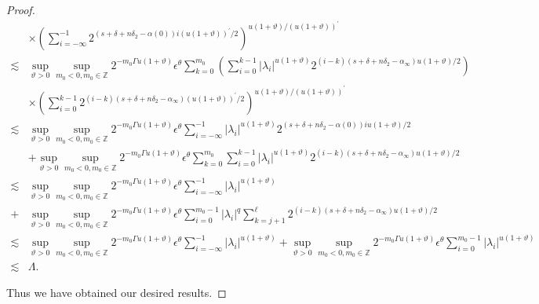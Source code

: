 \documentclass[oneside,reqno]{amsart}
\numberwithin{equation}{section}
\theoremstyle{definition}
\begin{document}
\begin{proof}
\begin{align*}
 &\times\left(\sum_{i=-\infty}^{-1} 2^{\left(s+\delta+n \delta_{2}-\alpha(0)\right) i( u(1+\vartheta))^{\prime} / 2}\right)^{u(1+\vartheta) / (u(1+\vartheta))^{\prime}} \\
\lesssim & \sup_{\vartheta>0 }\sup _{m_0<0, m_0\in  \mathbb{Z}} 2^{-m_0\Gamma u(1+\vartheta)} \epsilon  ^\theta \sum_{k=0}^{m_0}\left(\sum_{i=0}^{k-1}\left|\lambda_{i}\right|^{u(1+\vartheta)} 2^{(i-k)\left(s+\delta+n \delta_{2}-\alpha_{\infty}\right) u(1+\vartheta) / 2}\right) \\
& \times\left(\sum_{i=0}^{k-1} 2^{(i-k)\left(s+\delta+n \delta_{2}-\alpha_{\infty}\right) (u(1+\vartheta))^{\prime} / 2}\right)^{u(1+\vartheta) / (u(1+\vartheta))^{\prime}}\\
\lesssim & \sup_{\vartheta>0 }\sup _{m_0<0, m_0\in  \mathbb{Z}} 2^{-m_0\Gamma u(1+\vartheta)} \epsilon  ^\theta \sum_{i=-\infty}^{-1}\left|\lambda_{i}\right|^{u(1+\vartheta)} 2^{\left(s+\delta+n \delta_{2}-\alpha(0)\right) iu (1+\vartheta) / 2} \\
& +\sup_{\vartheta>0 }\sup _{m_0<0, m_0\in  \mathbb{Z}} 2^{-m_0\Gamma u(1+\vartheta)} \epsilon  ^\theta \sum_{k=0}^{m_0} \sum_{i=0}^{k-1}\left|\lambda_{i}\right|^{u(1+\vartheta)} 2^{(i-k)\left(s+\delta+n \delta_{2}-\alpha_{\infty}\right) u(1+\vartheta) / 2} \\
\lesssim & \sup_{\vartheta>0 }\sup _{m_0<0, m_0\in  \mathbb{Z}} 2^{-m_0\Gamma u(1+\vartheta)} \epsilon  ^\theta \sum_{i=-\infty}^{-1}\left|\lambda_{i}\right|^{u(1+\vartheta)} \\
+& \sup_{\vartheta>0 }\sup _{m_0<0, m_0\in  \mathbb{Z}} 2^{-m_0\Gamma u(1+\vartheta)} \epsilon  ^\theta \sum_{i=0}^{m_0-1}\left|\lambda_{i}\right|^{q} \sum_{k=j+1}^{\ell } 2^{(i-k)\left(s+\delta+n \delta_{2}-\alpha_{\infty}\right) u(1+\vartheta) / 2} \\
\lesssim & \sup_{\vartheta>0 }\sup _{m_0<0, m_0\in  \mathbb{Z}} 2^{-m_0\Gamma u(1+\vartheta)} \epsilon  ^\theta \sum_{i=-\infty}^{-1}\left|\lambda_{i}\right|^{u(1+\vartheta)}+\sup_{\vartheta>0 }\sup _{m_0<0, m_0\in  \mathbb{Z}} 2^{-m_0\Gamma u(1+\vartheta)} \epsilon  ^\theta \sum_{i=0}^{m_0-1}\left|\lambda_{i}\right|^{u(1+\vartheta)}\\
\lesssim & \Lambda .
\end{align*}





Thus we have obtained our desired results. 
\end{proof}
\end{document}

